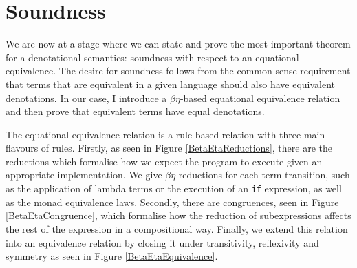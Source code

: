 \documentclass{Report}
\begin{document}
\section{Soundness}
We are now at a stage where we can state and prove the most important theorem for a denotational semantics: soundness with respect to an equational equivalence. The desire for soundness follows from the common sense requirement that terms that are equivalent in a given language should also have equivalent denotations. In our case, I introduce a $\beta\eta$-based equational equivalence relation and then prove that equivalent terms have equal denotations.

The equational equivalence relation is a rule-based relation with three main flavours of rules. Firstly, as seen in Figure \ref{BetaEtaReductions}, there are the reductions which formalise how we expect the program to execute given an appropriate implementation. We give $\beta\eta$-reductions for each term transition, such as the application of lambda terms or the execution of an \texttt{if} expression, as well as the monad equivalence laws. Secondly, there are congruences, seen in Figure \ref{BetaEtaCongruence}, which formalise how the reduction of subexpressions affects the rest of the expression in a compositional way. Finally, we extend this relation into an equivalence relation by closing it under transitivity, reflexivity and symmetry as seen in Figure \ref{BetaEtaEquivalence}.
\end{document}
